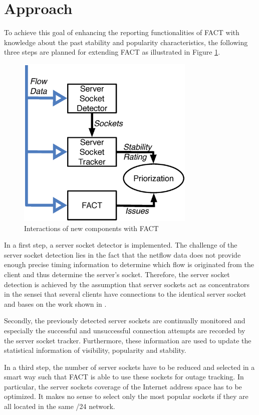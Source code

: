 \documentclass{sigcomm-alternate}
\begin{document}
\section{Approach}
To achieve this goal of enhancing the reporting functionalities of FACT
with knowledge about the past stability and popularity characteristics,
the following three steps are planned for extending FACT 
as illustrated in Figure \ref{fig:FACT}.

\begin{figure}[ht!]
\centering \includegraphics[width=8.5cm]{images/Approach_blockdiagram.eps}
\caption{Interactions of new components with FACT}
\label{fig:FACT}
\end{figure}


In a first step, a server socket detector is implemented. The
challenge of the server socket detection lies in the fact that the
netflow data does not provide enough precise timing information to
determine which flow is originated from the client and thus determine
the server's socket. Therefore, the server socket detection is
achieved by the assumption that server sockets act as concentrators
in the sensei that several clients have connections to the identical
server socket and bases on the work shown in \cite{Schatzmann:Dissection,Schatzmann:Mining,Schatzmann:Tracing}.

Secondly, the previously detected server sockets are continually
monitored and especially the successful and unsuccessful connection
attempts are recorded by the server socket tracker. 
Furthermore, these information are used to update the statistical 
information of visibility, popularity and stability.

In a third step, the number of server sockets have to be reduced and
selected in a smart way such that FACT is able to use these sockets
for outage tracking. In particular, the server sockets coverage of the
Internet address space has to be optimized. It makes no sense to select
only the most popular sockets if they are all located in the same /24
network.
\end{document}
